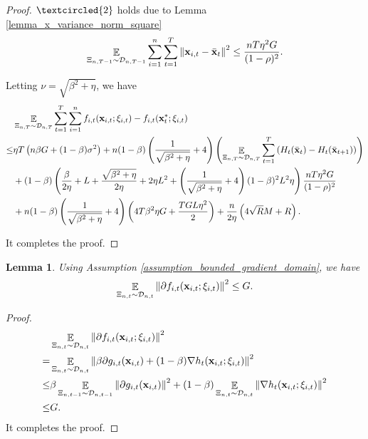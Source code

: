 \documentclass{article}
\newtheorem{Lemma}{\bf{Lemma}}
\begin{document}
\begin{proof}
$\textcircled{2}$ holds due to Lemma \ref{lemma_x_variance_norm_square}
\begin{align}
\nonumber
\mathop{\mathbb{E}}_{ \Xi_{n,T-1} \sim \mathcal{D}_{n,T-1} } \sum_{i=1}^n\sum_{t=1}^T \left\lVert{\bf x}_{i,t} - \bar{{\bf x}}_t\right\rVert^2 \le \frac{nT\eta^2 G }{(1-\rho)^2}.
\end{align}





Letting $\nu = \sqrt{\beta^2 + \eta}$, we have
\begin{align}
\nonumber
& \mathop{\mathbb{E}}_{ \Xi_{n,T} \sim \mathcal{D}_{n,T} } \sum_{t=1}^T\sum_{i=1}^n f_{i,t}({\bf x}_{i,t};\xi_{i,t}) - f_{i,t}({\bf x}_t^\ast;\xi_{i,t}) \\ \nonumber
\le & \eta T \left(  n\beta G + (1-\beta)\sigma^2 \right) + n(1-\beta)\left(  \frac{1}{\sqrt{\beta^2 + \eta}} + 4  \right) \left(  \mathop{\mathbb{E}}_{ \Xi_{n,T} \sim \mathcal{D}_{n,T} } \sum_{t=1}^T  \left( H_t(\bar{{\bf x}}_t) - H_t(\bar{{\bf x}}_{t+1}) \right)   \right) \\ \nonumber
& + (1-\beta)\left( \frac{\beta}{2\eta } +L + \frac{\sqrt{\beta^2 + \eta}}{2\eta} + 2\eta L^2  + \left( \frac{1}{\sqrt{\beta^2 + \eta}} + 4 \right)(1-\beta)^2L^2 \eta \right)  \frac{nT\eta^2 G }{(1-\rho)^2}  \\ \nonumber
& + n(1-\beta)\left(  \frac{1}{\sqrt{\beta^2 + \eta}} + 4  \right) \left(  4T\beta^2 \eta G + \frac{TGL\eta^2}{2}  \right)  + \frac{n}{2\eta}\left(  4\sqrt{R}M + R   \right).
\end{align}



It completes the proof.



\end{proof}


\begin{Lemma}
\label{lemma_stochastic_gradient_norm_bound}
Using Assumption \ref{assumption_bounded_gradient_domain}, we have
\begin{align}
\nonumber
\mathop{\mathbb{E}}_{ \Xi_{n,t} \sim \mathcal{D}_{n,t} }\left\lVert \partial f_{i,t}({\bf x}_{i,t};\xi_{i,t})\right\rVert^2 \le G.
\end{align}


\end{Lemma}
\begin{proof}

\begin{align}
\nonumber
& \mathop{\mathbb{E}}_{ \Xi_{n,t} \sim \mathcal{D}_{n,t} }\left\lVert \partial f_{i,t}({\bf x}_{i,t};\xi_{i,t})\right\rVert^2 \\ \nonumber 
= & \mathop{\mathbb{E}}_{ \Xi_{n,t} \sim \mathcal{D}_{n,t} }\left\lVert \beta \partial g_{i,t}({\bf x}_{i,t}) + (1-\beta)\nabla h_t({\bf x}_{i,t};\xi_{i,t})\right\rVert^2 \\ \nonumber 
\le &  \beta \mathop{\mathbb{E}}_{ \Xi_{n,t-1} \sim \mathcal{D}_{n,t-1} }\left\lVert \partial g_{i,t}({\bf x}_{i,t}) \right\rVert^2 + (1-\beta) \mathop{\mathbb{E}}_{ \Xi_{n,t} \sim \mathcal{D}_{n,t} } \left\lVert \nabla h_t({\bf x}_{i,t};\xi_{i,t}) \right\rVert^2 \\ \nonumber 
\le & G.
\end{align} It completes the proof.
\end{proof}
\end{document}
